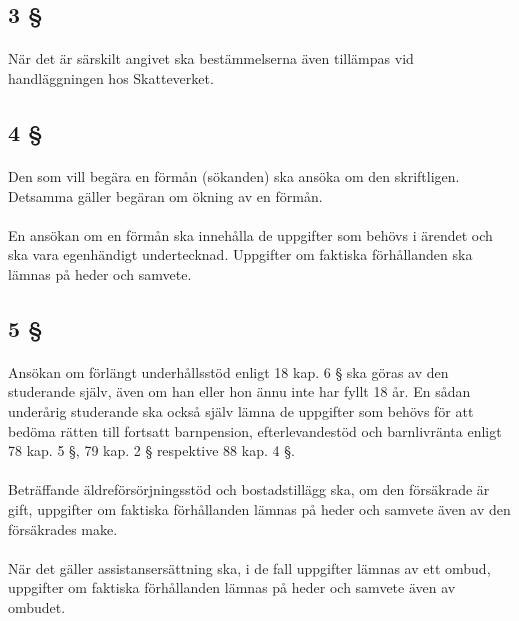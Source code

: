 \documentclass[a4paper,notitlepage,openany,10pt]{book}
\begin{document}
\subsection*{3 §}
\paragraph*{}
När det är särskilt angivet ska bestämmelserna även tillämpas vid handläggningen hos Skatteverket.
\subsection*{4 §}
\paragraph*{}
Den som vill begära en förmån (sökanden) ska ansöka om den skriftligen. Detsamma gäller begäran om ökning av en förmån.
\paragraph*{}
En ansökan om en förmån ska innehålla de uppgifter som behövs i ärendet och ska vara egenhändigt undertecknad. Uppgifter om faktiska förhållanden ska lämnas på heder och samvete.
\subsection*{5 §}
\paragraph*{}
Ansökan om förlängt underhållsstöd enligt 18 kap. 6 § ska göras av den studerande själv, även om han eller hon ännu inte har fyllt 18 år. En sådan underårig studerande ska också själv lämna de uppgifter som behövs för att bedöma rätten till fortsatt barnpension, efterlevandestöd och barnlivränta enligt 78 kap. 5 §, 79 kap. 2 § respektive 88 kap. 4 §.
\paragraph*{}
Beträffande äldreförsörjningsstöd och bostadstillägg ska, om den försäkrade är gift, uppgifter om faktiska förhållanden lämnas på heder och samvete även av den försäkrades make.
\paragraph*{}
När det gäller assistansersättning ska, i de fall uppgifter lämnas av ett ombud, uppgifter om faktiska förhållanden lämnas på heder och samvete även av ombudet.
\end{document}
